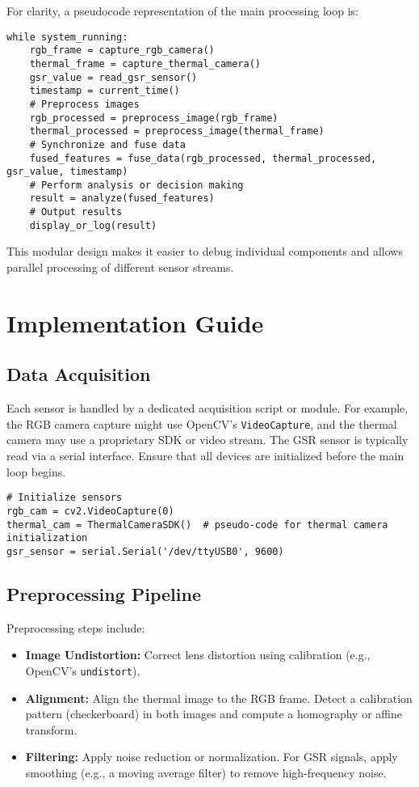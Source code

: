 \documentclass{article}
\begin{document}
    For clarity, a pseudocode representation of the main processing loop is:
    \begin{verbatim}
while system_running:
    rgb_frame = capture_rgb_camera()
    thermal_frame = capture_thermal_camera()
    gsr_value = read_gsr_sensor()
    timestamp = current_time()
    # Preprocess images
    rgb_processed = preprocess_image(rgb_frame)
    thermal_processed = preprocess_image(thermal_frame)
    # Synchronize and fuse data
    fused_features = fuse_data(rgb_processed, thermal_processed, gsr_value, timestamp)
    # Perform analysis or decision making
    result = analyze(fused_features)
    # Output results
    display_or_log(result)
    \end{verbatim}

    This modular design makes it easier to debug individual components and allows parallel processing of different sensor streams.


    \section{Implementation Guide}

    \subsection{Data Acquisition}

    Each sensor is handled by a dedicated acquisition script or module. For example, the RGB camera capture might use OpenCV’s \texttt{VideoCapture}, and the thermal camera may use a proprietary SDK or video stream. The GSR sensor is typically read via a serial interface. Ensure that all devices are initialized before the main loop begins.

    \begin{verbatim}
# Initialize sensors
rgb_cam = cv2.VideoCapture(0)
thermal_cam = ThermalCameraSDK()  # pseudo-code for thermal camera initialization
gsr_sensor = serial.Serial('/dev/ttyUSB0', 9600)
    \end{verbatim}

    \subsection{Preprocessing Pipeline}

    Preprocessing steps include:

    \begin{itemize}
        \item \textbf{Image Undistortion:} Correct lens distortion using calibration (e.g., OpenCV’s \texttt{undistort}).
        \item \textbf{Alignment:} Align the thermal image to the RGB frame. Detect a calibration pattern (checkerboard) in both images and compute a homography or affine transform.
        \item \textbf{Filtering:} Apply noise reduction or normalization. For GSR signals, apply smoothing (e.g., a moving average filter) to remove high-frequency noise.
    \end{itemize}
\end{document}
